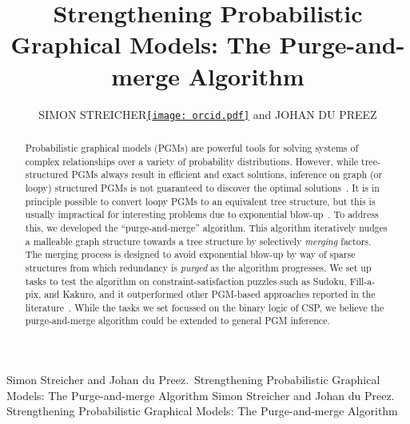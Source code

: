 \documentclass{ieeeaccess}
\begin{document}
	
\history{}

\title{Strengthening Probabilistic Graphical Models: The Purge-and-merge Algorithm}
\author{\uppercase{Simon Streicher}\href{https://orcid.org/0000-0001-9281-0411}{\texttt{[image: orcid.pdf]}} and \uppercase{Johan du Preez}}

\address[]{Department of Electrical and Electronic Engineering, Stellenbosch University,	Stellenbosch 7600, South Africa (e-mail: dupreez@sun.ac.za)}

\markboth
{Simon Streicher and Johan du Preez. \,Strengthening Probabilistic Graphical Models: The Purge-and-merge Algorithm}
{Simon Streicher and Johan du Preez. \,Strengthening Probabilistic Graphical Models: The Purge-and-merge Algorithm}


\begin{abstract}
	Probabilistic graphical models (PGMs) are powerful tools for solving systems of complex relationships over a variety of probability distributions. However, while tree-structured PGMs always result in efficient and exact solutions, inference on graph (or loopy) structured PGMs is not guaranteed to discover the optimal solutions~\cite[p391]{koller}. It is in principle possible to convert loopy PGMs to an equivalent tree structure, but this is usually impractical for interesting problems due to exponential blow-up~\cite[p336]{koller}. To address this, we developed the ``purge-and-merge'' algorithm. This algorithm iteratively nudges a malleable graph structure towards a tree structure by selectively \textit{merging} factors. The merging process is designed to avoid exponential blow-up by way of sparse structures from which redundancy is \textit{purged} as the algorithm progresses. We set up tasks to test the algorithm on constraint-satisfaction puzzles such as Sudoku, Fill-a-pix, and Kakuro, and it outperformed other PGM-based	approaches reported in the literature~\cite{BaukeH, GoldbergerJ, KhanS}. While the tasks we set focussed on the binary logic of CSP, we believe the purge-and-merge algorithm could be extended to general PGM inference.
\end{abstract}
\end{document}
